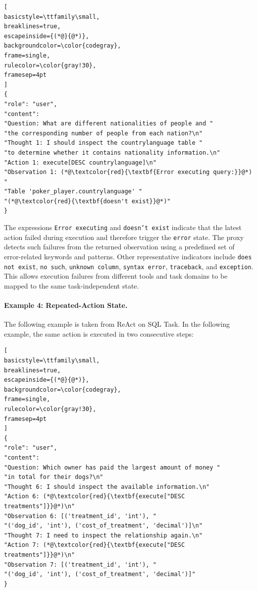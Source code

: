 \begin{lstlisting}[
basicstyle=\ttfamily\small,
breaklines=true,
escapeinside={(*@}{@*)},
backgroundcolor=\color{codegray},
frame=single,
rulecolor=\color{gray!30},
framesep=4pt
]
{
"role": "user",
"content":
"Question: What are different nationalities of people and "
"the corresponding number of people from each nation?\n"
"Thought 1: I should inspect the countrylanguage table "
"to determine whether it contains nationality information.\n"
"Action 1: execute[DESC countrylanguage]\n"
"Observation 1: (*@\textcolor{red}{\textbf{Error executing query:}}@*) "
"Table 'poker_player.countrylanguage' "
"(*@\textcolor{red}{\textbf{doesn't exist}}@*)"
}
\end{lstlisting}

The expressions \texttt{Error executing} and \texttt{doesn't exist}
indicate that the latest action failed during execution and therefore
trigger the \texttt{error} state. The proxy detects such failures from
the returned observation using a predefined set of error-related
keywords and patterns. Other representative indicators include
\texttt{does not exist}, \texttt{no such}, \texttt{unknown column},
\texttt{syntax error}, \texttt{traceback}, and \texttt{exception}.
This allows execution failures from different tools and task domains
to be mapped to the same task-independent state.

\clearpage

\paragraph{Example 4: Repeated-Action State.}
The following example is taken from ReAct on SQL Task.
In the following example, the same action is executed in two consecutive steps:

\begin{lstlisting}[
basicstyle=\ttfamily\small,
breaklines=true,
escapeinside={(*@}{@*)},
backgroundcolor=\color{codegray},
frame=single,
rulecolor=\color{gray!30},
framesep=4pt
]
{
"role": "user",
"content":
"Question: Which owner has paid the largest amount of money "
"in total for their dogs?\n"
"Thought 6: I should inspect the available information.\n"
"Action 6: (*@\textcolor{red}{\textbf{execute["DESC treatments"]}}@*)\n"
"Observation 6: [('treatment_id', 'int'), "
"('dog_id', 'int'), ('cost_of_treatment', 'decimal')]\n"
"Thought 7: I need to inspect the relationship again.\n"
"Action 7: (*@\textcolor{red}{\textbf{execute["DESC treatments"]}}@*)\n"
"Observation 7: [('treatment_id', 'int'), "
"('dog_id', 'int'), ('cost_of_treatment', 'decimal')]"
}
\end{lstlisting}

